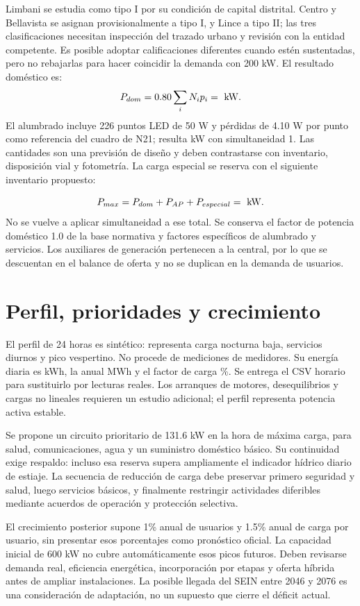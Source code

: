 Limbani se estudia como tipo I por su condición de capital distrital. Centro y Bellavista se asignan provisionalmente a tipo I, y Lince a tipo II; las tres clasificaciones necesitan inspección del trazado urbano y revisión con la entidad competente. Es posible adoptar calificaciones diferentes cuando estén sustentadas, pero no rebajarlas para hacer coincidir la demanda con 200 kW. El resultado doméstico es:
\begin{equation} P_{dom}=0.80\sum_i N_i p_i=\dato{Dom}\ \mathrm{kW}.\end{equation}
El alumbrado incluye 226 puntos LED de 50 W y pérdidas de 4.10 W por punto como referencia del cuadro de N21; resulta  kW con simultaneidad 1. Las cantidades son una previsión de diseño y deben contrastarse con inventario, disposición vial y fotometría. La carga especial se reserva con el siguiente inventario propuesto:

\begin{equation}P_{max}=P_{dom}+P_{AP}+P_{especial}=\dato{Demand}\ \mathrm{kW}.\end{equation}
No se vuelve a aplicar simultaneidad a ese total. Se conserva el factor de potencia doméstico 1.0 de la base normativa y factores específicos de alumbrado y servicios. Los auxiliares de generación pertenecen a la central, por lo que se descuentan en el balance de oferta y no se duplican en la demanda de usuarios.

\section{Perfil, prioridades y crecimiento}
El perfil de 24 horas es sintético: representa carga nocturna baja, servicios diurnos y pico vespertino. No procede de mediciones de medidores. Su energía diaria es  kWh, la anual  MWh y el factor de carga \%. Se entrega el CSV horario para sustituirlo por lecturas reales. Los arranques de motores, desequilibrios y cargas no lineales requieren un estudio adicional; el perfil representa potencia activa estable.

Se propone un circuito prioritario de 131.6 kW en la hora de máxima carga, para salud, comunicaciones, agua y un suministro doméstico básico. Su continuidad exige respaldo: incluso esa reserva supera ampliamente el indicador hídrico diario de estiaje. La secuencia de reducción de carga debe preservar primero seguridad y salud, luego servicios básicos, y finalmente restringir actividades diferibles mediante acuerdos de operación y protección selectiva.

El crecimiento posterior supone 1\% anual de usuarios y 1.5\% anual de carga por usuario, sin presentar esos porcentajes como pronóstico oficial. La capacidad inicial de 600 kW no cubre automáticamente esos picos futuros. Deben revisarse demanda real, eficiencia energética, incorporación por etapas y oferta híbrida antes de ampliar instalaciones. La posible llegada del SEIN entre 2046 y 2076 es una consideración de adaptación, no un supuesto que cierre el déficit actual.

